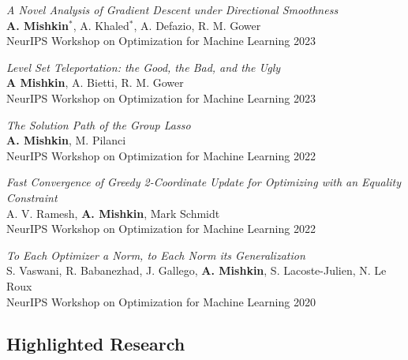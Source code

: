 \begin{description}[leftmargin=\mleftsize,style=nextline,font=\normalfont\space]
    \textit{A Novel Analysis of Gradient Descent under Directional Smoothness}\\
    {\bf A. Mishkin}$^*$, A. Khaled$^*$, A. Defazio, R. M. Gower\\
    {NeurIPS Workshop on Optimization for Machine Learning} 2023

    \textit{Level Set Teleportation: the Good, the Bad, and the Ugly}\\
    \textbf{A Mishkin}, A. Bietti, R. M. Gower\\
    {NeurIPS Workshop on Optimization for Machine Learning} 2023

    {\it The Solution Path of the Group Lasso}\\
    \textbf{A. Mishkin}, M. Pilanci\\
    {NeurIPS Workshop on Optimization for Machine Learning} 2022

    {\it Fast Convergence of Greedy 2-Coordinate Update for Optimizing with an Equality Constraint}\\
    A. V. Ramesh, {\bf A. Mishkin}, Mark Schmidt\\
    {NeurIPS Workshop on Optimization for Machine Learning} 2022

    {\it To Each Optimizer a Norm, to Each Norm its Generalization}\\
    S. Vaswani, R. Babanezhad, J. Gallego, {\bf A. Mishkin}, S. Lacoste-Julien, N. Le Roux\\
    {NeurIPS Workshop on Optimization for Machine Learning} 2020
\end{description}

\vspace{2ex}
\subsection{Highlighted Research}

